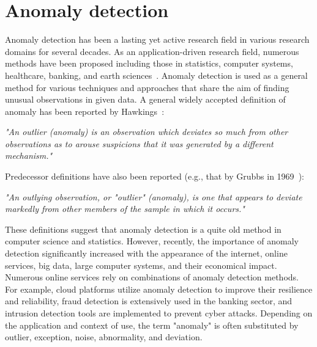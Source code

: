 \newpage

\section{Anomaly detection}\label{ch:background:sec:anomalydetection}
Anomaly detection has been a lasting yet active research field in various research domains for several decades. As an application-driven research field, numerous methods have been proposed including those in statistics, computer systems, healthcare, banking, and earth sciences~\cite{Aggarwal:2013:OA:2436823}. Anomaly detection is used as a general method for various techniques and approaches that share the aim of finding unusual observations in given data. A general widely accepted definition of anomaly has been reported by Hawkings~\cite{hawkins1980identification}:

\begin{center}
\textit{
"An outlier (anomaly) is an observation which deviates so much from
other observations as to arouse suspicions that it was generated by a
different mechanism."}
\end{center}


Predecessor definitions have also been reported (e.g., that by Grubbs in 1969~\cite{grubbs1969procedures}):

\begin{center}\textit{ 
"An outlying observation, or "outlier" (anomaly), is one that appears to deviate markedly from other members of the sample in which it occurs."}   
\end{center}

These definitions suggest that anomaly detection is a quite old method in computer science and statistics. However, recently, the importance of anomaly detection significantly increased with the appearance of the internet, online services, big data, large computer systems, and their economical impact. Numerous online services rely on combinations of anomaly detection methods. For example, cloud platforms utilize anomaly detection to improve their resilience and reliability, fraud detection is extensively used in the banking sector, and intrusion detection tools are implemented to prevent cyber attacks. Depending on the application and context of use, the term "anomaly" is often substituted by outlier, exception, noise, abnormality, and deviation. 

